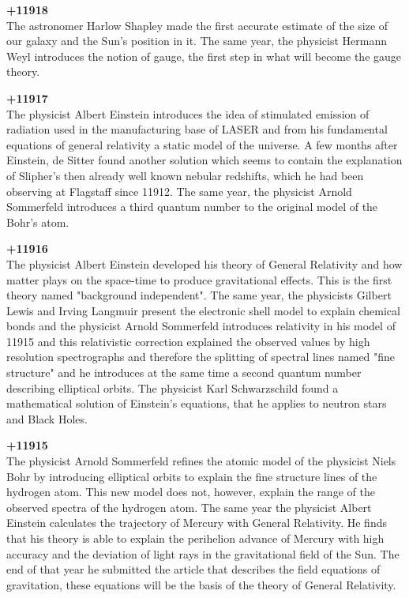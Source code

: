\textbf{+11918}\\
The astronomer Harlow Shapley made the first accurate estimate of the size of our galaxy and the Sun's position in it. The same year, the physicist Hermann Weyl introduces the notion of gauge, the first step in what will become the gauge theory.

\textbf{+11917}\\
The physicist Albert Einstein introduces the idea of stimulated emission of radiation used in the manufacturing base of LASER and from his fundamental equations of general relativity a static model of the universe. A few months after Einstein, de Sitter found another solution which seems to contain the explanation of Slipher’s then already well known nebular redshifts, which he had been observing at Flagstaff since 11912. The same year, the physicist Arnold Sommerfeld introduces a third quantum number to the original model of the Bohr's atom.

\textbf{+11916}\\
The physicist Albert Einstein developed his theory of General Relativity and how matter plays on the space-time to produce gravitational effects. This is the first theory named "background independent". The same year, the physicists Gilbert Lewis and Irving Langmuir present the electronic shell model to explain chemical bonds and the physicist Arnold Sommerfeld introduces relativity in his model of 11915 and this relativistic correction explained the observed values by high resolution spectrographs and therefore the splitting of spectral lines named "fine structure" and he introduces at the same time a second quantum number describing elliptical orbits. The physicist Karl Schwarzschild found a mathematical solution of Einstein's equations, that he applies to neutron stars and Black Holes.

\textbf{+11915}\\
The physicist Arnold Sommerfeld refines the atomic model of the physicist Niels Bohr by introducing elliptical orbits to explain the fine structure lines of the hydrogen atom. This new model does not, however, explain the range of the observed spectra of the hydrogen atom. The same year the physicist Albert Einstein calculates the trajectory of Mercury with General Relativity. He finds that his theory is able to explain the perihelion advance of Mercury with high accuracy and the deviation of light rays in the gravitational field of the Sun. The end of that year he submitted the article that describes the field equations of gravitation, these equations will be the basis of the theory of General Relativity.

